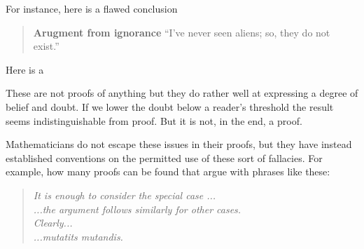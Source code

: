 \documentclass{amsart}
\begin{document}
For instance, here is a flawed conclusion 
\begin{quote}
    \textbf{Arugment from ignorance}
    ``I've never seen aliens; so, they do not exist.''
\end{quote}
Here is a 
\begin{quote}
    
\end{quote}
These are not proofs of anything but they do rather well at 
expressing a degree of belief and doubt.  If we lower the doubt 
below a reader's threshold the result seems indistinguishable from proof.
But it is not, in the end, a proof.

Mathematicians do not escape these issues in their proofs,
but they have instead established conventions on the permitted use 
of these sort of fallacies.  For example, how many proofs can be 
found that argue with phrases like these:
\begin{quote} 
    \emph{It is enough to consider the special case ...}\\
    \emph{...the argument follows similarly for other cases.}\\
    \emph{Clearly...}\\
    \emph{...mutatits mutandis.}
\end{quote}




\end{document}
